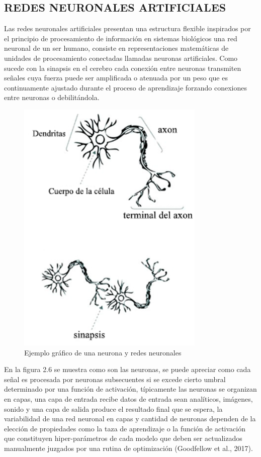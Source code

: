 \documentclass[letter, openright, 12pt]{book}
\newcommand*\setcaptioncitation[1]{\def\captioncitation{\textit{Fuente:}~#1}}
\let\captioncitation\relax
\begin{document}
\subsection{REDES NEURONALES ARTIFICIALES}
Las redes neuronales artificiales presentan una estructura flexible inspirados por el principio de procesamiento de información en sistemas biológicos una red neuronal de un ser humano, consiste en representaciones matemáticas de unidades de procesamiento conectadas llamadas neuronas artificiales. Como sucede con la sinapsis en el cerebro cada conexión entre neuronas transmiten señales cuya fuerza puede ser amplificada o atenuada por un peso que es continuamente ajustado durante el proceso de aprendizaje forzando conexiones entre neuronas o debilitándola. 

\begin{figure}[H]
\includegraphics[width=0.8\textwidth]{figura2_6}
\setcaptioncitation{(MengZenzhu, 2020)}
\caption{Ejemplo gráfico de una neurona y redes neuronales}
\label{tab:figura2_6} 
\end{figure}

En la figura 2.6 se muestra como son las neuronas, se puede apreciar como cada señal es procesada por neuronas subsecuentes si se excede cierto umbral determinado por una función de activación, típicamente las neuronas se organizan en capas, una capa de entrada recibe datos de entrada sean analíticos, imágenes, sonido y una capa de salida produce el resultado final que se espera, la variabilidad de una red neuronal en capas y cantidad de neuronas dependen de la elección de propiedades como la taza de aprendizaje o la función de activación que constituyen hiper-parámetros de cada modelo que deben ser actualizados manualmente juzgados por una rutina de optimización (Goodfellow et al., 2017).
\end{document}
